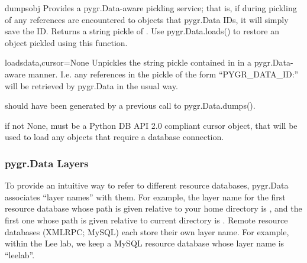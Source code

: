 \documentclass{howto}
\begin{document}
\begin{funcdesc}{dumps}{obj}
  Provides a pygr.Data-aware pickling service; that is, if
  during pickling of  any references are encountered
  to objects that pygr.Data IDs, it will simply save the ID.
  Returns a string pickle of .
  Use pygr.Data.loads() to restore an object pickled using this function.
\end{funcdesc}

\begin{funcdesc}{loads}{data,cursor=None}
  Unpickles the string pickle contained in  in a pygr.Data-aware
  manner.  I.e. any references in the pickle of the form ``PYGR_DATA_ID:''
  will be retrieved by pygr.Data in the usual way.

   should have
  been generated by a previous call to pygr.Data.dumps().

   if not None, must be a Python DB API 2.0 compliant
  cursor object, that will be used to load any objects that require
  a database connection.
\end{funcdesc}


\subsubsection{pygr.Data Layers}
To provide an intuitive way to refer to different resource databases,
pygr.Data associates ``layer names'' with them.  For example, the layer
name for the first resource database whose path is given relative to 
your home directory is , and the first one whose path is given
relative to current directory is .  Remote resource databases
(XMLRPC; MySQL) each store their own layer name.  For example, within the
Lee lab, we keep a MySQL resource database whose layer name is ``leelab''.
\end{document}

